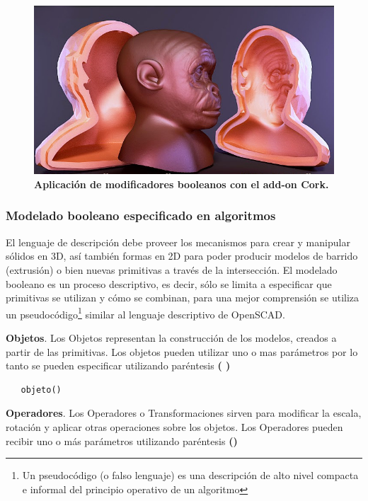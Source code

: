 \begin{figure}[h]
\includegraphics[width=12cm]{Img/Modelos/modelado23.jpg}
\centering
\caption{\textbf{ \footnotesize{Aplicación de modificadores booleanos con el add-on Cork. }}}
\end{figure}





\clearpage
\subsubsection{Modelado booleano especificado en algoritmos}

El lenguaje de descripción debe proveer los mecanismos para crear y manipular sólidos en 3D, así también formas en 2D para poder producir modelos de barrido (extrusión) o bien nuevas primitivas a través de la intersección. El  modelado  booleano  es  un proceso  descriptivo,  es  decir,  sólo  se limita  a  especificar que primitivas se utilizan y cómo se combinan, para una mejor comprensión se utiliza un pseudocódigo\footnote{Un pseudocódigo (o falso lenguaje) es una descripción de alto nivel compacta e informal del principio operativo de un algoritmo} similar al lenguaje descriptivo de OpenSCAD.

\textbf{Objetos}. Los Objetos representan la construcción de los modelos, creados a partir  de las primitivas. Los objetos pueden utilizar uno o mas parámetros por lo tanto se pueden especificar utilizando paréntesis \textbf{( )}

\begin{verbatim}
   objeto()
\end{verbatim}


\textbf{Operadores}. Los Operadores o Transformaciones sirven para modificar la escala, rotación y aplicar otras operaciones sobre los objetos. Los Operadores pueden recibir uno o más parámetros utilizando paréntesis \textbf{()}

